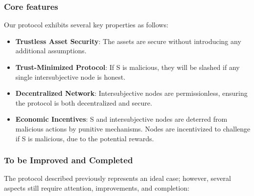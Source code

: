 \subsubsection{Core features}

Our protocol exhibits several key properties as follows:

\begin{itemize}
    \item \textbf{Trustless Asset Security}: The assets are secure without introducing any additional assumptions.
    \item \textbf{Trust-Minimized Protocol}: If S is malicious, they will be slashed if any single intersubjective node is honest.
    \item \textbf{Decentralized Network}: Intersubjective nodes are permissionless, ensuring the protocol is both decentralized and secure.
    \item \textbf{Economic Incentives}: S and intersubjective nodes are deterred from malicious actions by punitive mechanisms. Nodes are incentivized to challenge if S is malicious, due to the potential rewards.
\end{itemize}


\subsubsection{To be Improved and Completed}

The protocol described previously represents an ideal case; however, several aspects still require attention, improvements, and completion:

